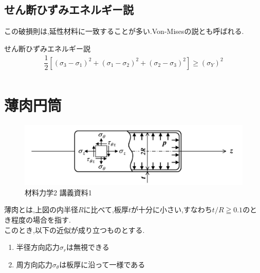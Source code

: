 \documentclass[a4paper]{jsarticle}
\begin{document}
\subsection{せん断ひずみエネルギー説}
この破損則は,延性材料に一致することが多い.Von-Misesの説とも呼ばれる.
\begin{itembox}[l]{せん断ひずみエネルギー説}
    \begin{eqnarray*}
        \dfrac{1}{2}\left[\left(\sigma_3-\sigma_1\right)^2+\left(\sigma_1-\sigma_2\right)^2+\left(\sigma_2-\sigma_3\right)^2\right]\geq\left(\sigma_Y\right)^2\\
    \end{eqnarray*}
\end{itembox}
\section{薄肉円筒}
\begin{figure}[htbp]
    \begin{center}
        \includegraphics[width=150mm]{images/zairiki_image1.jpg}
        \caption{材料力学2 講義資料1}
    \end{center}
\end{figure}
薄肉とは,上図の内半径$R$に比べて,板厚$t$が十分に小さい,すなわち$t/R \geqq 0.1$のとき程度の場合を指す.\\
このとき,以下の近似が成り立つものとする.
\begin{enumerate}[(1)]
    \item 半径方向応力$\sigma_r$は無視できる
    \item 周方向応力$\sigma_\theta$は板厚に沿って一様である
\end{enumerate}
\end{document}
